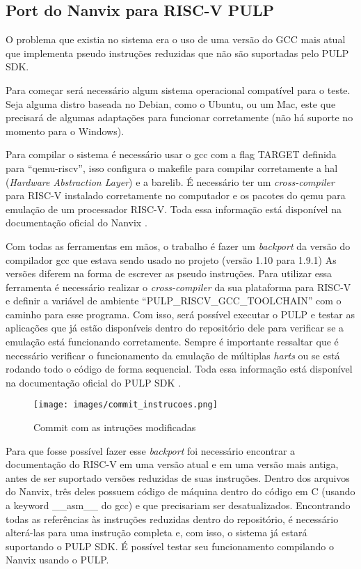 \subsection{Port do Nanvix para RISC-V PULP}

O problema que existia no sistema era o uso de uma versão do GCC mais atual que implementa pseudo instruções reduzidas que não são suportadas pelo PULP SDK. 

Para começar será necessário algum sistema operacional compatível para o teste. Seja alguma distro baseada no Debian, como o Ubuntu, ou um Mac, este que 
precisará de algumas adaptações para funcionar corretamente (não há suporte no momento para o Windows). 

Para compilar o sistema é necessário usar o gcc com a flag TARGET definida para “qemu-riscv”, isso configura o makefile para compilar corretamente a 
hal (\textit{Hardware Abstraction Layer}) e a barelib. É necessário ter um \textit{cross-compiler} para RISC-V instalado corretamente no computador e os pacotes do qemu 
para emulação de um processador RISC-V. Toda essa informação está disponível na documentação oficial do Nanvix \cite{NanvixOS}. 

Com todas as ferramentas em mãos, o trabalho é fazer um \textit{backport} da versão do compilador gcc que estava sendo usado no projeto (versão 1.10 para 1.9.1) As versões diferem na forma de escrever as pseudo instruções. Para utilizar essa ferramenta é necessário realizar o \textit{cross-compiler} da sua plataforma para RISC-V e definir a variável de ambiente “PULP\_RISCV\_GCC\_TOOLCHAIN” com o caminho para esse programa. Com isso, será possível executar o PULP e testar as aplicações que já estão disponíveis dentro do repositório dele para verificar se a emulação está funcionando corretamente. Sempre é importante ressaltar que é necessário verificar o 
funcionamento da emulação de múltiplas \textit{harts} ou se está rodando todo o código de forma sequencial. Toda essa informação está disponível na documentação oficial 
do PULP SDK \cite{PulpSDKRepositorio}.

\begin{figure}[h!]
    \centering
    \texttt{[image: images/commit\_instrucoes.png]}
    \caption{Commit com as intruções modificadas \\ \cite{SolucaoInstrucoesDOWNGrade}} %
\end{figure}

Para que fosse possível fazer esse \textit{backport} foi necessário encontrar a documentação do RISC-V em uma versão atual e em uma versão mais antiga, antes de ser suportado versões reduzidas de suas instruções. Dentro dos arquivos do Nanvix, três deles  possuem código de máquina dentro do código em C (usando a keyword \_\_asm\_\_ do gcc) e que precisariam ser desatualizados. Encontrando todas as referências às instruções reduzidas dentro do repositório, é necessário alterá-las para uma instrução completa e, com isso, o sistema já estará suportando o PULP SDK. É possível testar seu funcionamento compilando o Nanvix usando o PULP.
